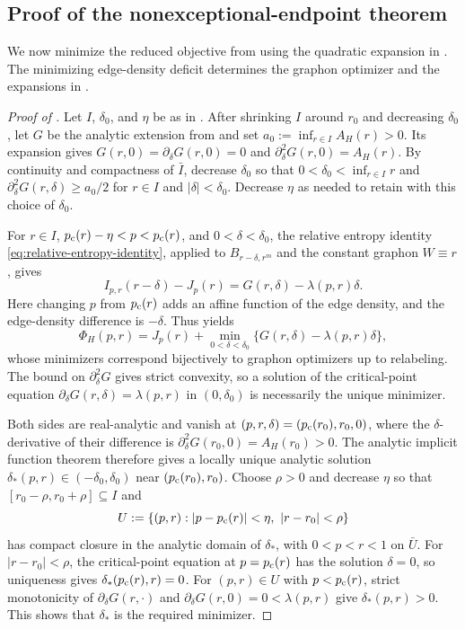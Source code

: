 \subsection{Proof of the nonexceptional-endpoint theorem}\label{sec:nonexceptional-proof}

We now minimize the reduced objective from 
using the quadratic expansion in .
The minimizing edge-density deficit determines the graphon optimizer and the expansions
in .

\begin{proof}[Proof of ]
Let $I$, $\delta_0$, and $\eta$ be as in .
After shrinking $I$ around $r_0$ and decreasing $\delta_0$, let $G$ be the
analytic extension from  and set
$a_0:=\inf_{r\in I}A_H(r)>0$.  Its expansion gives
$G(r,0)=\partial_\delta G(r,0)=0$ and $\partial_\delta^2G(r,0)=A_H(r)$.
By continuity and compactness of $\bar I$, decrease $\delta_0$ so that
$0<\delta_0<\inf_{r\in I}r$ and $\partial_\delta^2G(r,\delta)\ge a_0/2$
for $r\in I$ and $|\delta|<\delta_0$.
Decrease $\eta$ as needed to retain  with this
choice of $\delta_0$.

For $r\in I$, $p_{\mathrm c}(r)-\eta<p<p_{\mathrm c}(r)$, and $0<\delta<\delta_0$,
the relative entropy identity \eqref{eq:relative-entropy-identity},
applied to $B_{r-\delta,r^m}$ and the constant graphon $W\equiv r$, gives
\[
  I_{p,r}(r-\delta)-J_p(r)
  =G(r,\delta)-\lambda(p,r)\delta.
\]
Here changing $p$ from $p_{\mathrm c}(r)$ adds an affine function of the edge density,
and the edge-density difference is $-\delta$.
Thus  yields
\begin{equation}\label{eq:edge-deficit-minimization}
  \Phi_H(p,r)
  =J_p(r)+\min_{0<\delta<\delta_0}
    \{G(r,\delta)-\lambda(p,r)\delta\},
\end{equation}
whose minimizers correspond bijectively to graphon optimizers up to
relabeling.  The bound on $\partial_\delta^2G$ gives strict convexity, so a
solution of the critical-point equation $\partial_\delta G(r,\delta)=\lambda(p,r)$
in $(0,\delta_0)$ is necessarily the unique minimizer.

Both sides are real-analytic and vanish at
$(p,r,\delta)=(p_{\mathrm c}(r_0),r_0,0)$, where the $\delta$-derivative of their
difference is $\partial_\delta^2G(r_0,0)=A_H(r_0)>0$.
The analytic implicit function theorem therefore gives a locally unique
analytic solution $\delta_*(p,r)\in(-\delta_0,\delta_0)$ near $(p_{\mathrm c}(r_0),r_0)$.
Choose $\rho>0$ and decrease $\eta$ so that
$[r_0-\rho,r_0+\rho]\subseteq I$ and
\[
  U:=\{(p,r):|p-\pc(r)|<\eta,\ |r-r_0|<\rho\}
\]
has compact closure in the analytic domain of $\delta_*$,
with $0<p<r<1$ on $\bar U$.
For $|r-r_0|<\rho$, the critical-point equation at $p=p_{\mathrm c}(r)$ has the
solution $\delta=0$, so uniqueness gives $\delta_*(p_{\mathrm c}(r),r)=0$.
For $(p,r)\in U$ with $p<p_{\mathrm c}(r)$, strict monotonicity of
$\partial_\delta G(r,\cdot)$ and $\partial_\delta G(r,0)=0<\lambda(p,r)$
give $\delta_*(p,r)>0$.  This shows that $\delta_*$ is the required minimizer.


\end{proof}
